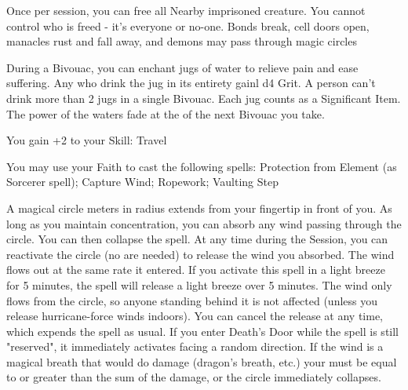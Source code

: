 {

Once per session, you can free all Nearby imprisoned creature. You cannot control who is freed - it's everyone or no-one. Bonds break, cell doors open, manacles rust and fall away, and demons may pass through magic circles


During a Bivouac, you can enchant \DICE jugs of water to relieve pain and ease suffering.  Any who drink the jug in its entirety gainl d4 Grit.  A person can't drink more than 2 jugs in a single Bivouac.  Each jug counts as a Significant Item.  The power of the waters fade at the  of the next Bivouac you take.




\GOD[
Name=Kismet,
Link=small-god-kismet,
GodOf=Arbiter of Journeys,
Holy=a carved walking stick
]


You gain +2 to your Skill: Travel


You may use your Faith to cast the following spells: Protection from Element (as Sorcerer spell); Capture Wind; Ropework; Vaulting Step

\LITURGY [
  Name= Capture Wind,
  Link= kismet-liturgy-capture-wind,
  Paradigm= Elements ,
  Save=  N ,
  Duration= Concentration/Session ,
  Counter=  n/a  ,
  Keywords= None ,
  Target=   Point in front of you
]



A magical circle \DICE meters in radius extends from your fingertip in front of you. As long as you maintain concentration, you can absorb any wind passing through the circle. You can then collapse the spell. 
At any time during the Session, you can reactivate the circle (no \DICE are needed) to release the wind you absorbed.  The wind flows out at the same rate it entered. If you activate this spell in a light breeze for 5 minutes, the spell will release a light breeze over 5 minutes. The wind only flows from the circle, so anyone standing behind it is not affected (unless you release hurricane-force winds indoors). You can cancel the release at any time, which expends the spell as usual. If you enter Death's Door while the spell is still "reserved", it immediately activates facing a random direction.  
If the wind is a magical breath that would do damage (dragon's breath, etc.) your \SUMDICE must be equal to or greater than the sum of the damage, or the circle immediately collapses.  

}
